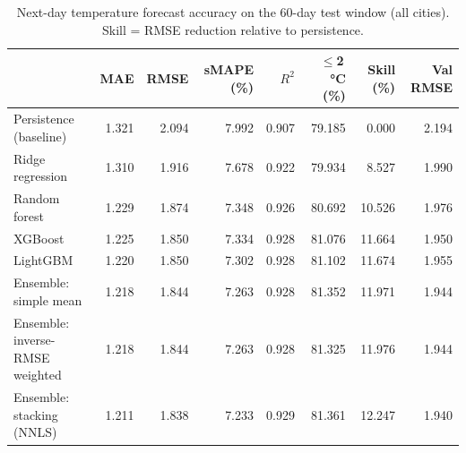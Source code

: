 \begin{table}
\caption{Next-day temperature forecast accuracy on the 60-day test window (all cities). Skill = RMSE reduction relative to persistence.}
\label{tab:model_comparison}
\begin{tabular}{lrrrrrrr}
\toprule
 & MAE & RMSE & sMAPE (\%) & $R^2$ & $\le$2\,°C (\%) & Skill (\%) & Val RMSE \\
\midrule
Persistence (baseline) & 1.321 & 2.094 & 7.992 & 0.907 & 79.185 & 0.000 & 2.194 \\
Ridge regression & 1.310 & 1.916 & 7.678 & 0.922 & 79.934 & 8.527 & 1.990 \\
Random forest & 1.229 & 1.874 & 7.348 & 0.926 & 80.692 & 10.526 & 1.976 \\
XGBoost & 1.225 & 1.850 & 7.334 & 0.928 & 81.076 & 11.664 & 1.950 \\
LightGBM & 1.220 & 1.850 & 7.302 & 0.928 & 81.102 & 11.674 & 1.955 \\
Ensemble: simple mean & 1.218 & 1.844 & 7.263 & 0.928 & 81.352 & 11.971 & 1.944 \\
Ensemble: inverse-RMSE weighted & 1.218 & 1.844 & 7.263 & 0.928 & 81.325 & 11.976 & 1.944 \\
Ensemble: stacking (NNLS) & 1.211 & 1.838 & 7.233 & 0.929 & 81.361 & 12.247 & 1.940 \\
\bottomrule
\end{tabular}
\end{table}
